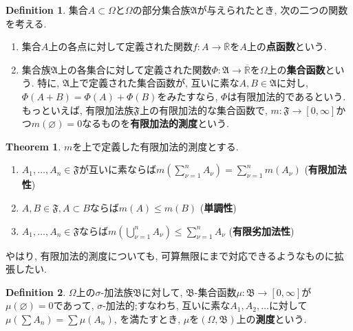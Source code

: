 \documentclass[a4j,dvipdfmx]{jsarticle}
\newcommand{\F}{\mathfrak{F}}
\newcommand{\B}{\mathfrak{B}}
\theoremstyle{definition}
\newtheorem{definition}{Definition}[section]
\theoremstyle{definition}
\newtheorem{theorem}{Theorem}[section]
\numberwithin{equation}{section}
\begin{document}
            \begin{definition}
                集合$A\subset \Omega$と$\Omega$の部分集合族$\mathfrak{A}$が与えられたとき, 次の二つの関数を考える.
                \begin{enumerate}\renewcommand{\labelenumi}{(\arabic{enumi})}
                    \item 集合$A$上の各点に対して定義された関数$f:A\to \overline{\mathbb{R}}$を$A$上の\textbf{点函数}という.
                    \item 集合族$\mathfrak{A}$上の各集合に対して定義された関数$\Phi:\mathfrak{A}\to \overline{\mathbb{R}}$を$\Omega$上の\textbf{集合函数}という.
                    特に, $\mathfrak{A}$上で定義された集合函数が, 互いに素な$A,B\in \mathfrak{A}$に対し, $\Phi(A+B)=\Phi(A)+\Phi(B)$をみたすなら, $\Phi$は有限加法的であるという.
                    もっといえば, 有限加法族$\F$上の有限加法的な集合函数で, $m:\F\to[0,\infty]$かつ$m(\varnothing)=0$なるものを\textbf{有限加法的測度}という.
                \end{enumerate}
            \end{definition}

            \begin{theorem} $m$を上で定義した有限加法的測度とする.
                \begin{enumerate}\renewcommand{\labelenumi}{(\arabic{enumi})}
                    \item $A_1,\dots,A_n\in \F$が互いに素ならば$m\left(\sum\limits_{\nu=1}^{n} A_\nu\right)=\sum\limits_{\nu=1}^{n}m(A_\nu)$ (\textbf{有限加法性})
                    \item $A,B\in\F,A\subset B$ならば$m(A)\leq m(B)$ (\textbf{単調性})
                    \item $A_1,\dots,A_n\in\F$ならば$m\left(\bigcup\limits_{\nu=1}^n A_\nu\right)\leq \sum\limits_{\nu=1}^nA_\nu$ (\textbf{有限劣加法性})
                \end{enumerate}
            \end{theorem}

            やはり, 有限加法的測度についても, 可算無限にまで対応できるようなものに拡張したい.

            \begin{definition}
                $\Omega$上の$\sigma$-加法族$\B$に対して, $\B$-集合函数$\mu:\B\to [0,\infty]$が$\mu(\varnothing)=0$であって, \textbf{$\sigma$}-加法的;すなわち, 
                互いに素な$A_1,A_2,\dots$に対して$\mu(\sum A_n)=\sum\mu(A_n)$, を満たすとき, $\mu$を$(\Omega,\B)$上の\textbf{測度}という.
            \end{definition}
\end{document}
